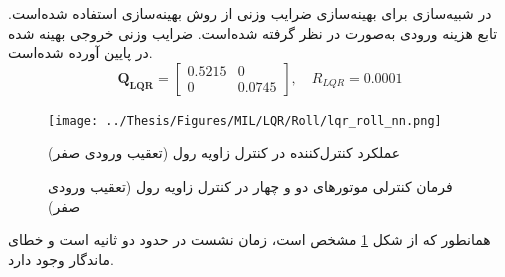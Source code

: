 \documentclass{CCI2020}
\begin{document}
	در شبیه‌سازی برای بهینه‌سازی ضرایب وزنی  از روش بهینه‌سازی
	 \cite{Karimi2010}
	استفاده شده‌است.
	تابع هزینه ورودی  به‌صورت
	در نظر گرفته شده‌است. ضرایب وزنی خروجی بهینه شده در پایین آورده شده‌است.
	\begin{equation}
		\boldsymbol{Q_{LQR}} = \begin{bmatrix}
			0.5215 & 0\\
			0 & 0.0745
		\end{bmatrix}, \quad R_{LQR} =  0.0001
	\end{equation} 
	\begin{figure}[H]
		\texttt{[image: ../Thesis/Figures/MIL/LQR/Roll/lqr\_roll\_nn.png]}
		\centering
		\caption{عملكرد کنترل‌کننده  در کنترل زاويه رول (تعقیب ورودی صفر)}
		\label{lqr_roll_figure_simulation}
	\end{figure}
	\begin{figure}[H]
		\centering
		\caption{فرمان کنترلی موتورهای دو و چهار در کنترل زاویه رول (تعقیب ورودی صفر)}
	\end{figure}
 همانطور که از شکل
	\ref{lqr_roll_figure_simulation}
	مشخص است، زمان نشست در حدود دو ثانیه است و خطای ماندگار وجود دارد.
	
	
	
	
	
	
\end{document}
